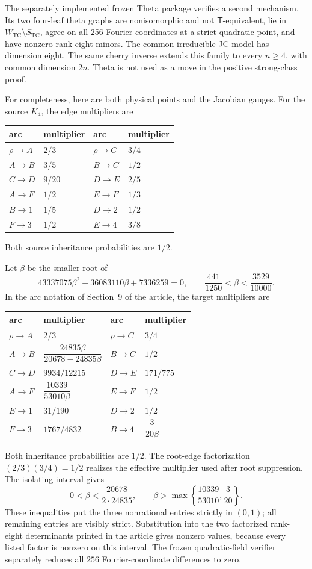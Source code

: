 \documentclass[11pt]{article}
\newcommand{\Tmove}{\mathsf T}
\begin{document}
The separately implemented frozen Theta package verifies a second mechanism.  Its two
four-leaf theta graphs are nonisomorphic and not $\Tmove$-equivalent, lie in
$W_{\mathrm{TC}}\setminus S_{\mathrm{TC}}$, agree on all 256 Fourier
coordinates at a strict quadratic point, and have nonzero rank-eight minors.
The common irreducible JC model has dimension eight.  The same cherry inverse
extends this family to every $n\ge4$, with common dimension $2n$.  Theta is
not used as a move in the positive strong-class proof.

For completeness, here are both physical points and the Jacobian gauges.
For the source $K_4$, the edge multipliers are
\begin{center}
\small
\begin{tabular}{ll@{\qquad}ll}
\toprule
arc & multiplier & arc & multiplier\\
\midrule
$\rho\to A$&$2/3$&$\rho\to C$&$3/4$\\
$A\to B$&$3/5$&$B\to C$&$1/2$\\
$C\to D$&$9/20$&$D\to E$&$2/5$\\
$A\to F$&$1/2$&$E\to F$&$1/3$\\
$B\to1$&$1/5$&$D\to2$&$1/2$\\
$F\to3$&$1/2$&$E\to4$&$3/8$\\
\bottomrule
\end{tabular}
\end{center}
Both source inheritance probabilities are $1/2$.

Let $\beta$ be the smaller root of
\[
43337075\beta^2-36083110\beta+7336259=0,
\qquad \frac{441}{1250}<\beta<\frac{3529}{10000}.
\]
In the arc notation of Section~9 of the article, the target multipliers are
\begin{center}
\small
\begin{tabular}{ll@{\qquad}ll}
\toprule
arc & multiplier & arc & multiplier\\
\midrule
$\rho\to A$&$2/3$&$\rho\to C$&$3/4$\\
$A\to B$&$\dfrac{24835\beta}{20678-24835\beta}$
  &$B\to C$&$1/2$\\
$C\to D$&$9934/12215$&$D\to E$&$171/775$\\
$A\to F$&$\dfrac{10339}{53010\beta}$&$E\to F$&$1/2$\\
$E\to1$&$31/190$&$D\to2$&$1/2$\\
$F\to3$&$1767/4832$&$B\to4$&$\dfrac{3}{20\beta}$\\
\bottomrule
\end{tabular}
\end{center}
Both inheritance probabilities are $1/2$.  The root-edge factorization
$(2/3)(3/4)=1/2$ realizes the effective multiplier used after root
suppression.  The isolating interval gives
\[
0<\beta<\frac{20678}{2\cdot24835},\qquad
\beta>\max\left\{\frac{10339}{53010},\frac3{20}\right\}.
\]
These inequalities put the three nonrational entries strictly in $(0,1)$;
all remaining entries are visibly strict.  Substitution into the two
factorized rank-eight determinants printed in the article gives nonzero
values, because every listed factor is nonzero on this interval.  The frozen
quadratic-field verifier separately reduces all $256$ Fourier-coordinate
differences to zero.
\end{document}
